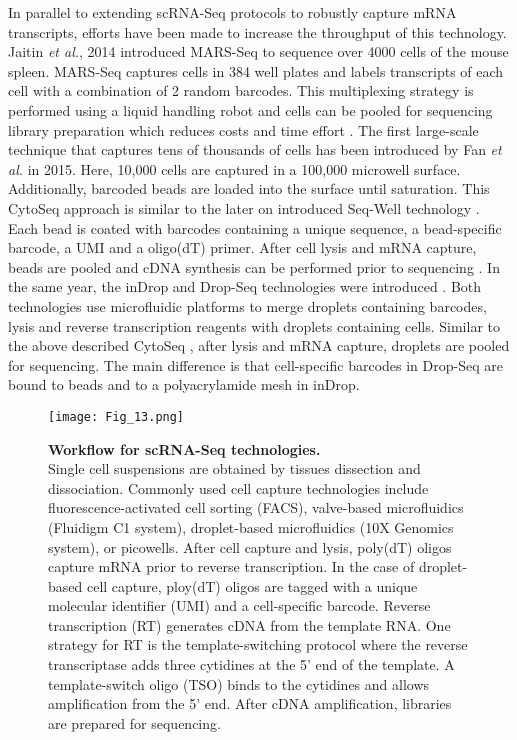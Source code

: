In parallel to extending scRNA-Seq protocols to robustly capture mRNA transcripts, efforts have been made to increase the throughput of this technology. Jaitin \emph{et al.}, 2014 introduced \gls{MARS-Seq} to sequence over 4000 cells of the mouse spleen. MARS-Seq captures cells in 384 well plates and labels transcripts of each cell with a combination of 2 random barcodes. This multiplexing strategy is performed using a liquid handling robot and cells can be pooled for sequencing library preparation which reduces costs and time effort \citep{Jaitin2014}. The first large-scale technique that captures tens of thousands of cells has been introduced by Fan \emph{et al.} in 2015. Here, 10,000 cells are captured in a 100,000 microwell surface. Additionally, barcoded beads are loaded into the surface until saturation. This CytoSeq approach is similar to the later on introduced Seq-Well technology \citep{Gierahn2017}. Each bead is coated with barcodes containing a unique sequence, a bead-specific barcode, a UMI and a oligo(dT) primer. After cell lysis and mRNA capture, beads are pooled and cDNA synthesis can be performed prior to sequencing \citep{Fan2015}. In the same year, the inDrop and Drop-Seq technologies were introduced \citep{Klein2015, Macosko2015}. Both technologies use microfluidic platforms to merge droplets containing barcodes, lysis and reverse transcription reagents with droplets containing cells. Similar to the above described CytoSeq \citep{Fan2015}, after lysis and mRNA capture, droplets are pooled for sequencing. The main difference is that cell-specific barcodes in Drop-Seq are bound to beads and to a polyacrylamide mesh in inDrop.  \\ 

\begin{figure}[!h]
\centering
\texttt{[image: Fig\_13.png]}
\caption[Workflow for scRNA-Seq technologies]{\textbf{Workflow for scRNA-Seq technologies.}\\
Single cell suspensions are obtained by tissues dissection and dissociation. Commonly used cell capture technologies include fluorescence-activated cell sorting (FACS), valve-based microfluidics (Fluidigm\textsuperscript{\textregistered{}} C1 system), droplet-based microfluidics (10X Genomics\textsuperscript{\textregistered{}} system), or picowells. After cell capture and lysis, poly(dT) oligos capture mRNA prior to reverse transcription. In the case of droplet-based cell capture, ploy(dT) oligos are tagged with a unique molecular identifier (UMI) and a cell-specific barcode. Reverse transcription (RT) generates cDNA from the template RNA. One strategy for RT is the template-switching protocol where the reverse transcriptase adds three cytidines at the 5' end of the template. A template-switch oligo (TSO) binds to the cytidines and allows amplification from the 5' end. After cDNA amplification, libraries are prepared for sequencing.}
\label{fig0:scDNA-Seq}
\end{figure}


